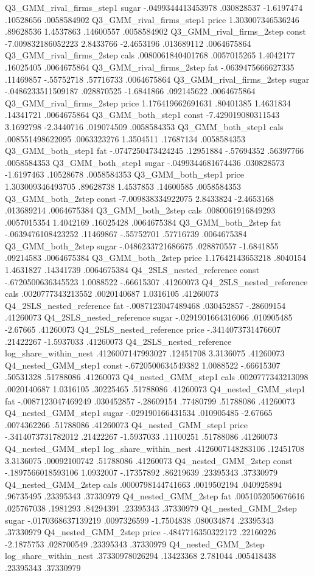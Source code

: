 Q3_GMM_rival_firms_step1	sugar	-.0499344413453978	.030828537	-1.6197474	.10528656	.0058584902	
Q3_GMM_rival_firms_step1	price	1.303007346536246	.89628536	1.4537863	.14600557	.0058584902	
Q3_GMM_rival_firms_2step	const	-7.009832186052223	2.8433766	-2.4653196	.013689112	.0064675864	
Q3_GMM_rival_firms_2step	cals	.0080061840401768	.0057015265	1.4042177	.16025405	.0064675864	
Q3_GMM_rival_firms_2step	fat	-.0639475666627335	.11469857	-.55752718	.57716733	.0064675864	
Q3_GMM_rival_firms_2step	sugar	-.0486233511509187	.028870525	-1.6841866	.092145622	.0064675864	
Q3_GMM_rival_firms_2step	price	1.176419662691631	.80401385	1.4631834	.14341721	.0064675864	
Q3_GMM_both_step1	const	-7.429019080311543	3.1692798	-2.3440716	.019074509	.0058584353	
Q3_GMM_both_step1	cals	.008551498622095	.0063323276	1.3504511	.17687134	.0058584353	
Q3_GMM_both_step1	fat	-.0747250473424245	.12951884	-.57694352	.56397766	.0058584353	
Q3_GMM_both_step1	sugar	-.0499344681674436	.030828573	-1.6197463	.10528678	.0058584353	
Q3_GMM_both_step1	price	1.303009346493705	.89628738	1.4537853	.14600585	.0058584353	
Q3_GMM_both_2step	const	-7.009838334922075	2.8433824	-2.4653168	.013689214	.0064675384	
Q3_GMM_both_2step	cals	.0080061916849293	.0057015354	1.4042169	.16025428	.0064675384	
Q3_GMM_both_2step	fat	-.0639476108423252	.11469867	-.55752701	.57716739	.0064675384	
Q3_GMM_both_2step	sugar	-.0486233721686675	.028870557	-1.6841855	.09214583	.0064675384	
Q3_GMM_both_2step	price	1.17642143653218	.8040154	1.4631827	.14341739	.0064675384	
Q4_2SLS_nested_reference	const	-.6720500636345523	1.0088522	-.66615307			.41260073
Q4_2SLS_nested_reference	cals	.0020777343213552	.0020140687	1.0316105			.41260073
Q4_2SLS_nested_reference	fat	-.0087123047489468	.030452857	-.28609154			.41260073
Q4_2SLS_nested_reference	sugar	-.0291901664316066	.010905485	-2.67665			.41260073
Q4_2SLS_nested_reference	price	-.3414073731476607	.21422267	-1.5937033			.41260073
Q4_2SLS_nested_reference	log_share_within_nest	.4126007147993027	.12451708	3.3136075			.41260073
Q4_nested_GMM_step1	const	-.6720500634549382	1.0088522	-.66615307	.50531328	.51788086	.41260073
Q4_nested_GMM_step1	cals	.0020777343213098	.0020140687	1.0316105	.30225465	.51788086	.41260073
Q4_nested_GMM_step1	fat	-.0087123047469249	.030452857	-.28609154	.77480799	.51788086	.41260073
Q4_nested_GMM_step1	sugar	-.029190166431534	.010905485	-2.67665	.0074362266	.51788086	.41260073
Q4_nested_GMM_step1	price	-.3414073731782012	.21422267	-1.5937033	.11100251	.51788086	.41260073
Q4_nested_GMM_step1	log_share_within_nest	.4126007148283106	.12451708	3.3136075	.00092100742	.51788086	.41260073
Q4_nested_GMM_2step	const	-.1897566018593106	1.0932007	-.17357892	.86219639	.23395343	.37330979
Q4_nested_GMM_2step	cals	.0000798144741663	.0019502194	.040925894	.96735495	.23395343	.37330979
Q4_nested_GMM_2step	fat	.0051052050676616	.025767038	.1981293	.84294391	.23395343	.37330979
Q4_nested_GMM_2step	sugar	-.0170368637139219	.0097326599	-1.7504838	.080034874	.23395343	.37330979
Q4_nested_GMM_2step	price	-.4847716350322172	.22160226	-2.1875753	.028700549	.23395343	.37330979
Q4_nested_GMM_2step	log_share_within_nest	.37330978026294	.13423368	2.781044	.005418438	.23395343	.37330979
